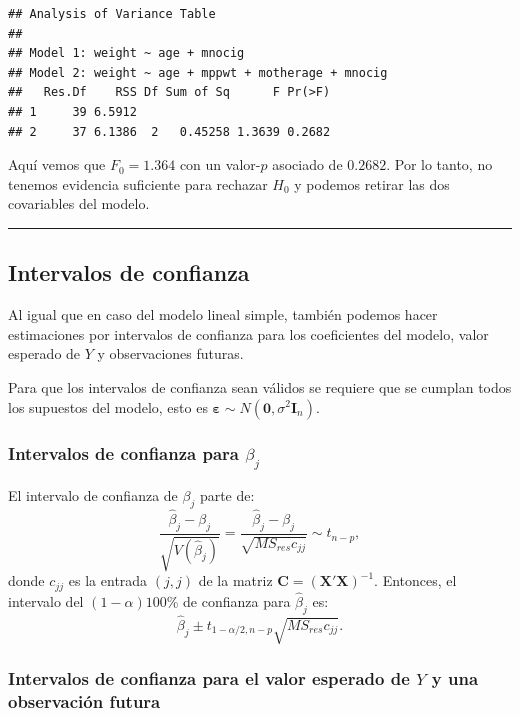 \documentclass[
]{article}
\begin{document}
\begin{verbatim}
## Analysis of Variance Table
## 
## Model 1: weight ~ age + mnocig
## Model 2: weight ~ age + mppwt + motherage + mnocig
##   Res.Df    RSS Df Sum of Sq      F Pr(>F)
## 1     39 6.5912                           
## 2     37 6.1386  2   0.45258 1.3639 0.2682
\end{verbatim}

Aquí vemos que \(F_{0}= 1.364\) con un valor-\(p\) asociado de \(0.2682\). Por lo tanto, no tenemos evidencia suficiente para rechazar \(H_{0}\) y podemos retirar las dos covariables del modelo.

\rule{\textwidth}{0.4pt}

\hypertarget{intervalos-de-confianza-1}{%
\subsection{Intervalos de confianza}\label{intervalos-de-confianza-1}}

Al igual que en caso del modelo lineal simple, también podemos hacer estimaciones por intervalos de confianza para los coeficientes del modelo, valor esperado de \(Y\) y observaciones futuras.

Para que los intervalos de confianza sean válidos se requiere que se cumplan todos los supuestos del modelo, esto es \(\boldsymbol \varepsilon\sim N(\boldsymbol 0, \sigma^{2}\boldsymbol I_{n})\).

\hypertarget{intervalos-de-confianza-para-beta_j}{%
\subsubsection{\texorpdfstring{Intervalos de confianza para \(\beta_{j}\)}{Intervalos de confianza para \textbackslash beta\_\{j\}}}\label{intervalos-de-confianza-para-beta_j}}

El intervalo de confianza de \(\beta_{j}\) parte de:
\[
\frac{\widehat{\beta}_{j} - \beta_{j}}{\sqrt{V(\widehat{\beta}_{j})}} =  \frac{\widehat{\beta}_{j} - \beta_{j}}{\sqrt{MS_{res}c_{jj}}} \sim t_{n-p},
\]
donde \(c_{jj}\) es la entrada \((j,j)\) de la matriz \(\boldsymbol C=(\boldsymbol X'\boldsymbol X)^{-1}\). Entonces, el intervalo del \((1-\alpha)100\%\) de confianza para \(\widehat{\beta}_{j}\) es:
\[
\widehat{\beta}_{j} \pm t_{1-\alpha/2,n-p}\sqrt{MS_{res}c_{jj}}.
\]

\hypertarget{intervalos-de-confianza-para-el-valor-esperado-de-y-y-una-observaciuxf3n-futura}{%
\subsubsection{\texorpdfstring{Intervalos de confianza para el valor esperado de \(Y\) y una observación futura}{Intervalos de confianza para el valor esperado de Y y una observación futura}}\label{intervalos-de-confianza-para-el-valor-esperado-de-y-y-una-observaciuxf3n-futura}}
\end{document}
